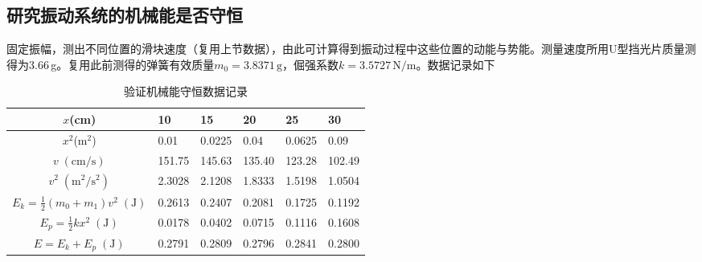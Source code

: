 \documentclass[UTF-8,twoside,cs4size]{ctexart}
\begin{document}
	\subsection{研究振动系统的机械能是否守恒}
	固定振幅，测出不同位置的滑块速度（复用上节数据），由此可计算得到振动过程中这些位置的动能与势能。测量速度所用U型挡光片质量测得为3.66\,g。复用此前测得的弹簧有效质量$ m_0=3.8371\,\mathrm g $，倔强系数$ k=3.5727\,\mathrm{N/m} $。数据记录如下
	\begin{table}[!h]
		\centering
		\renewcommand\arraystretch{1.5}
		\begin{tabularx}{\textwidth}{|c|Y|Y|Y|Y|Y|}			
			\hline
			$ x $\;(cm)&10&15&20&25&30\\
			\hline
			$ x^2 $\;(m$ ^2 $)&0.01&0.0225&0.04&0.0625&0.09\\
			\hline
			$ v\;(\mathrm{cm/s}) $&151.75&145.63&135.40&123.28&102.49\\
			\hline
			$ v^2\;(\mathrm{m^2/s^2}) $&2.3028&2.1208&1.8333&1.5198&1.0504\\
			\hline
			$ E_k=\frac12(m_0+m_1)v^2\;(\mathrm J) $&0.2613&0.2407&0.2081&0.1725&0.1192\\
			\hline
			$ E_p=\frac12kx^2\;(\mathrm J) $&0.0178&0.0402&0.0715&0.1116&0.1608\\
			\hline
			$ E=E_k+E_p\;(\mathrm J) $&0.2791&0.2809&0.2796&0.2841&0.2800\\
			\hline
		\end{tabularx}
		\caption{验证机械能守恒数据记录}
	\end{table}
\end{document}
